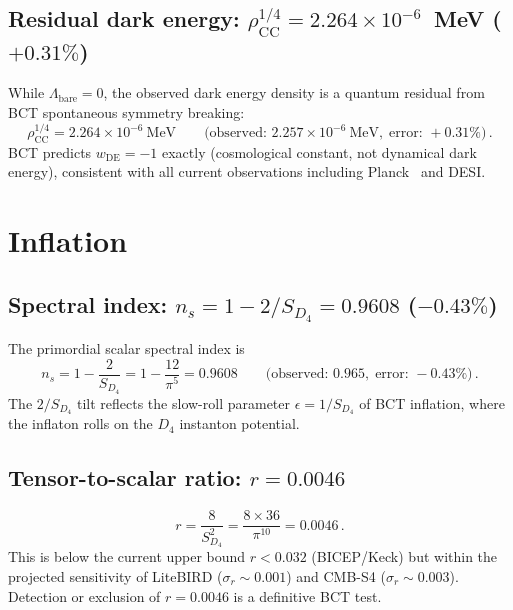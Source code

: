 \documentclass[review,number,sort&compress]{elsarticle}
\newcommand{\SD}{S_{D_4}}
\newcommand{\Dfour}{D_4}
\begin{document}
\subsection{Residual dark energy: $\rho_{\mathrm{CC}}^{1/4} = 2.264 \times 10^{-6}$~MeV ($+0.31\%$)}

While $\Lambda_{\mathrm{bare}} = 0$, the observed dark energy density is
a quantum residual from BCT spontaneous symmetry breaking:
\begin{equation}
  \rho_{\mathrm{CC}}^{1/4} = 2.264 \times 10^{-6}~\text{MeV} \qquad
  \bigl(\text{observed: } 2.257 \times 10^{-6}~\text{MeV},\;
  \text{error: } +0.31\%\bigr)\,.
  \label{eq:CC}
\end{equation}
BCT predicts $w_{\mathrm{DE}} = -1$ exactly (cosmological constant,
not dynamical dark energy), consistent with all current observations
including Planck~\cite{Planck2018} and DESI.

\section{Inflation}
\label{sec:inflation}

\subsection{Spectral index: $n_s = 1 - 2/\SD = 0.9608$ ($-0.43\%$)}

The primordial scalar spectral index is
\begin{equation}
  n_s = 1 - \frac{2}{\SD} = 1 - \frac{12}{\pi^5} = 0.9608 \qquad
  \bigl(\text{observed: } 0.965,\;\text{error: } -0.43\%\bigr)\,.
  \label{eq:ns}
\end{equation}
The $2/\SD$ tilt reflects the slow-roll parameter $\epsilon = 1/\SD$
of BCT inflation, where the inflaton rolls on the $\Dfour$ instanton
potential.

\subsection{Tensor-to-scalar ratio: $r = 0.0046$}

\begin{equation}
  r = \frac{8}{\SD^2} = \frac{8 \times 36}{\pi^{10}} = 0.0046\,.
  \label{eq:r}
\end{equation}
This is below the current upper bound $r < 0.032$ (BICEP/Keck) but
within the projected sensitivity of LiteBIRD ($\sigma_r \sim 0.001$)
and CMB-S4 ($\sigma_r \sim 0.003$). Detection or exclusion of
$r = 0.0046$ is a definitive BCT test.
\end{document}
